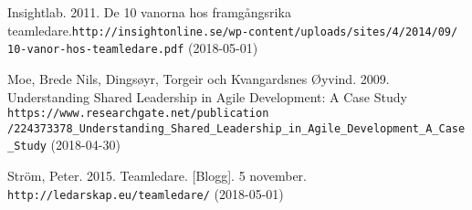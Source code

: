 \begin{thebibliography}{99}

Insightlab. 2011. De 10 vanorna hos framgångsrika teamledare.\texttt{http://insightonline.se/wp-content/uploads/sites/4/2014/09/
10-vanor-hos-teamledare.pdf}
(2018-05-01)

Moe, Brede Nils, Dingsøyr, Torgeir och Kvangardsnes Øyvind. 2009. Understanding Shared Leadership in Agile Development: A Case Study
\texttt{https://www.researchgate.net/publication
/224373378\_Understanding\_Shared\_Leadership\_in\_Agile\_Development\_A\_Case\_Study}
(2018-04-30)

 Ström, Peter. 2015. Teamledare. [Blogg]. 5 november. \texttt{http://ledarskap.eu/teamledare/} 
(2018-05-01)


\end{thebibliography}